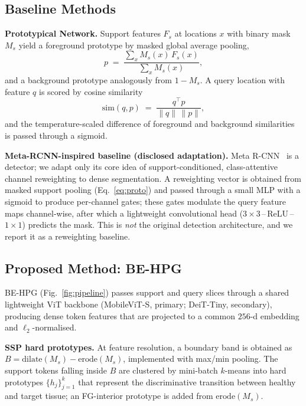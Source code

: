 \documentclass[conference]{IEEEtran}
\begin{document}
\subsection{Baseline Methods}
\textbf{Prototypical Network.} Support features $F_s$ at locations $x$ with binary mask $M_s$
yield a foreground prototype by masked global average pooling,
\begin{equation}
  p \;=\; \frac{\sum_{x} M_s(x)\,F_s(x)}{\sum_{x} M_s(x)},
  \label{eq:proto}
\end{equation}
and a background prototype analogously from $1-M_s$. A query location with feature $q$ is scored by
cosine similarity
\begin{equation}
  \mathrm{sim}(q,p) \;=\; \frac{q^{\top} p}{\lVert q\rVert\,\lVert p\rVert},
  \label{eq:cos}
\end{equation}
and the temperature-scaled difference of foreground and background similarities is passed through
a sigmoid.

\textbf{Meta-RCNN-inspired baseline (disclosed adaptation).} Meta R-CNN~\cite{yan2019meta} is a
detector; we adapt only its core idea of support-conditioned, class-attentive channel reweighting
to dense segmentation. A reweighting vector is obtained from masked support pooling
(Eq.~\ref{eq:proto}) and passed through a small MLP with a sigmoid to produce per-channel gates;
these gates modulate the query feature maps channel-wise, after which a lightweight convolutional
head ($3{\times}3$\,--\,ReLU\,--\,$1{\times}1$) predicts the mask. This is \emph{not} the original
detection architecture, and we report it as a reweighting baseline.

\subsection{Proposed Method: BE-HPG}
BE-HPG (Fig.~\ref{fig:pipeline}) passes support and query slices through a shared lightweight ViT
backbone (MobileViT-S, primary; DeiT-Tiny, secondary), producing dense token features that are
projected to a common $256$-d embedding and $\ell_2$-normalised.

\textbf{SSP hard prototypes.} At feature resolution, a boundary band is obtained as
$B=\mathrm{dilate}(M_s)-\mathrm{erode}(M_s)$, implemented with max/min pooling. The support tokens
falling inside $B$ are clustered by mini-batch $k$-means into hard prototypes $\{h_j\}_{j=1}^{k}$
that represent the discriminative transition between healthy and target tissue; an FG-interior
prototype is added from $\mathrm{erode}(M_s)$.
\end{document}
